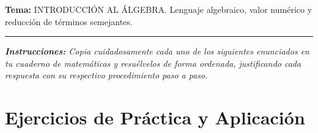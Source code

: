\documentclass[12pt, letterpaper]{article}
\begin{document}
	\vspace{0.2cm}
	\noindent \textbf{Tema:} INTRODUCCIÓN AL ÁLGEBRA. Lenguaje algebraico, valor numérico y reducción de términos semejantes.
	\vspace{0.2cm}
	\hrule
	\vspace{0.4cm}
	
	\noindent \textit{\textbf{Instrucciones:} Copia cuidadosamente cada uno de los siguientes enunciados en tu cuaderno de matemáticas y resuélvelos de forma ordenada, justificando cada respuesta con su respectivo procedimiento paso a paso.}
	\vspace{0.6cm}
	
	\section*{Ejercicios de Práctica y Aplicación}
	
\end{document}
